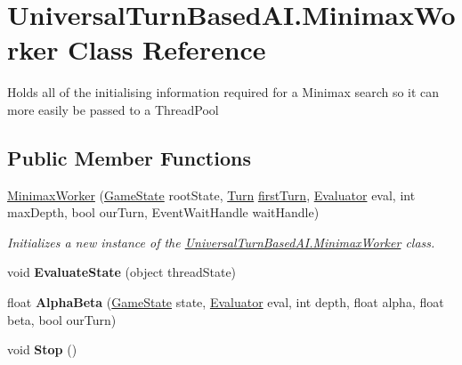 \hypertarget{class_universal_turn_based_a_i_1_1_minimax_worker}{}\section{Universal\+Turn\+Based\+A\+I.\+Minimax\+Worker Class Reference}
\label{class_universal_turn_based_a_i_1_1_minimax_worker}


Holds all of the initialising information required for a Minimax search so it can more easily be passed to a Thread\+Pool  


\subsection*{Public Member Functions}
\begin{DoxyCompactItemize}
\item 
\hyperlink{class_universal_turn_based_a_i_1_1_minimax_worker_a82bd3b80cb0061eba98ca52eae4c2114}{Minimax\+Worker} (\hyperlink{class_universal_turn_based_a_i_1_1_game_state}{Game\+State} root\+State, \hyperlink{class_universal_turn_based_a_i_1_1_turn}{Turn} \hyperlink{class_universal_turn_based_a_i_1_1_minimax_worker_ac4ce50aa90e42a8702e5ad783a35f05b}{first\+Turn}, \hyperlink{class_universal_turn_based_a_i_1_1_evaluator}{Evaluator} eval, int max\+Depth, bool our\+Turn, Event\+Wait\+Handle wait\+Handle)
\begin{DoxyCompactList}\small\item\em Initializes a new instance of the \hyperlink{class_universal_turn_based_a_i_1_1_minimax_worker}{Universal\+Turn\+Based\+A\+I.\+Minimax\+Worker} class. \end{DoxyCompactList}\item 
\hypertarget{class_universal_turn_based_a_i_1_1_minimax_worker_a3003a7a26d65f3e6ef877f21c7c7d307}{}void {\bfseries Evaluate\+State} (object thread\+State)\label{class_universal_turn_based_a_i_1_1_minimax_worker_a3003a7a26d65f3e6ef877f21c7c7d307}

\item 
\hypertarget{class_universal_turn_based_a_i_1_1_minimax_worker_a223dc0c8825a7ef9b5fb0656b2b5695a}{}float {\bfseries Alpha\+Beta} (\hyperlink{class_universal_turn_based_a_i_1_1_game_state}{Game\+State} state, \hyperlink{class_universal_turn_based_a_i_1_1_evaluator}{Evaluator} eval, int depth, float alpha, float beta, bool our\+Turn)\label{class_universal_turn_based_a_i_1_1_minimax_worker_a223dc0c8825a7ef9b5fb0656b2b5695a}

\item 
\hypertarget{class_universal_turn_based_a_i_1_1_minimax_worker_aaf19d669a25879a067716e12af1326be}{}void {\bfseries Stop} ()\label{class_universal_turn_based_a_i_1_1_minimax_worker_aaf19d669a25879a067716e12af1326be}

\end{DoxyCompactItemize}
